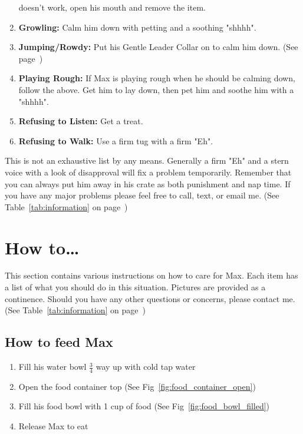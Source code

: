 \documentclass[pdftex,12pt]{article}
\begin{document}
\begin{enumerate}
        doesn't work, open his mouth and remove the item.
    \item \textbf{Growling:} Calm him down with petting and a soothing "shhhh".
    \item \textbf{Jumping/Rowdy:} Put his Gentle Leader Collar on to calm him
        down. (See page~\pageref{itm:how_to_gentle_leader})
    \item \textbf{Playing Rough:} If Max is playing rough when he should be
        calming down, follow the above. Get him to lay down, then pet him and
        soothe him with a "shhhh".
    \item \textbf{Refusing to Listen:} Get a treat.
    \item \textbf{Refusing to Walk:} Use a firm tug with a firm "Eh".
\end{enumerate}

\bigskip

This is not an exhaustive list by any means. Generally a firm "Eh" and a stern
voice with a look of disapproval will fix a problem temporarily. Remember that
you can always put him away in his crate as both punishment and nap time. If you
have any major problems please feel free to call, text, or email me.
(See Table~\ref{tab:information} on page~\pageref{tab:information})

\newpage
\section{How to\ldots}

This section contains various instructions on how to care for Max. Each item has
a list of what you should do in this situation. Pictures are provided as a
continence. Should you have any other questions or concerns, please contact me.
(See Table~\ref{tab:information} on page~\pageref{tab:information})

\subsection{How to feed Max}
\begin{enumerate}\label{itm:how_to_feed}
    \item Fill his water bowl $\frac{3}{4}$ way up with cold tap water
    \item Open the food container top (See Fig~\ref{fig:food_container_open})
    \item Fill his food bowl with 1 cup of food (See Fig~\ref{fig:food_bowl_filled})
    \item Release Max to eat
\end{enumerate}
\end{document}

